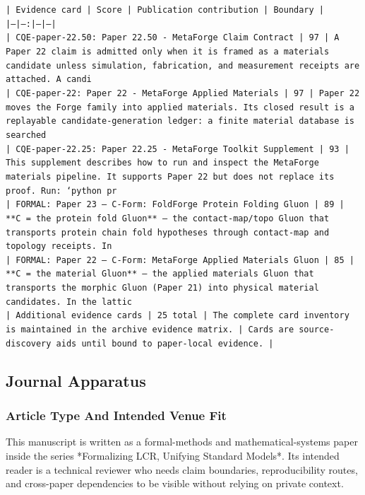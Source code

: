 \documentclass[11pt]{article}
\begin{document}
\noindent\texttt{| Evidence card | Score | Publication contribution | Boundary |}\\
\noindent\texttt{|---|---:|---|---|}\\
\noindent\texttt{| CQE-paper-22.50: Paper 22.50 - MetaForge Claim Contract | 97 | A Paper 22 claim is admitted only when it is framed as a materials candidate unless simulation, fabrication, and measurement receipts are attached. A candi}\\
\noindent\texttt{| CQE-paper-22: Paper 22 - MetaForge Applied Materials | 97 | Paper 22 moves the Forge family into applied materials. Its closed result is a replayable candidate-generation ledger: a finite material database is searched }\\
\noindent\texttt{| CQE-paper-22.25: Paper 22.25 - MetaForge Toolkit Supplement | 93 | This supplement describes how to run and inspect the MetaForge materials pipeline. It supports Paper 22 but does not replace its proof. Run: `python pr}\\
\noindent\texttt{| FORMAL: Paper 23 — C-Form: FoldForge Protein Folding Gluon | 89 | **C = the protein fold Gluon** — the contact-map/topo Gluon that transports protein chain fold hypotheses through contact-map and topology receipts. In }\\
\noindent\texttt{| FORMAL: Paper 22 — C-Form: MetaForge Applied Materials Gluon | 85 | **C = the material Gluon** — the applied materials Gluon that transports the morphic Gluon (Paper 21) into physical material candidates. In the lattic}\\
\noindent\texttt{| Additional evidence cards | 25 total | The complete card inventory is maintained in the archive evidence matrix. | Cards are source-discovery aids until bound to paper-local evidence. |}\\

\subsection*{Journal Apparatus}

\subsubsection*{Article Type And Intended Venue Fit}

This manuscript is written as a formal-methods and mathematical-systems paper
inside the series *Formalizing LCR, Unifying Standard Models*. Its intended
reader is a technical reviewer who needs claim boundaries, reproducibility
routes, and cross-paper dependencies to be visible without relying on private
context.
\end{document}
